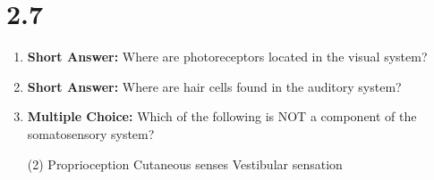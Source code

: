 
\section*{2.7}

\begin{enumerate}[label=\textbf{Q2.7.\arabic*}]

      \item \textbf{Short Answer:} Where are photoreceptors located in the visual system? \\
            
      \item \textbf{Short Answer:} Where are hair cells found in the auditory system? \\

      \item \textbf{Multiple Choice:} Which of the following is NOT a component of the somatosensory system?
            \begin{tasks}[label=\textcolor{draculafg}{(\Alph*)}, item-format=\color{draculafg}, label-width=1.5em, item-indent=1.7em](2)
                  \task Proprioception
                  \task Cutaneous senses
                  \task {}
                  \task Vestibular sensation
            \end{tasks}


\end{enumerate}
